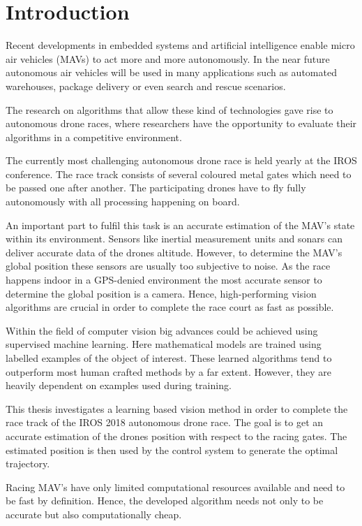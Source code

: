 \chapter{Introduction}
\label{sec:intro}

Recent developments in embedded systems and artificial intelligence enable micro air vehicles (MAVs) to act more and more autonomously. In the near future autonomous air vehicles will be used in many applications such as automated warehouses, package delivery or even search and rescue scenarios.

The research on algorithms that allow these kind of technologies gave rise to autonomous drone races, where researchers have the opportunity to evaluate their algorithms in a competitive environment.

The currently most challenging autonomous drone race is held yearly at the IROS conference. The race track consists of several coloured metal gates which need to be passed one after another. The participating drones have to fly fully autonomously with all processing happening on board.

An important part to fulfil this task is an accurate estimation of the MAV's state within its environment. Sensors like inertial measurement units and sonars can deliver accurate data of the drones altitude. However, to determine the MAV's global position these sensors are usually too subjective to noise. As the race happens indoor in a GPS-denied environment the most accurate sensor to determine the global position is a camera. Hence, high-performing vision algorithms are crucial in order to complete the race court as fast as possible. 

Within the field of computer vision big advances could be achieved using supervised machine learning. Here mathematical models are trained using labelled examples of the object of interest. These learned algorithms tend to outperform most human crafted methods by a far extent. However, they are heavily dependent on examples used during training.

This thesis investigates a learning based vision method in order to complete the race track of the IROS 2018 autonomous drone race. The goal is to get an accurate estimation of the drones position with respect to the racing gates. The estimated position is then used by the control system to generate the optimal trajectory.

Racing MAV's have only limited computational resources available and need to be fast by definition. Hence, the developed algorithm needs not only to be accurate but also computationally cheap.

